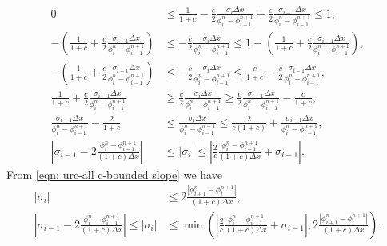 \documentclass[../thesis.tex]{subfiles}
\begin{document}
\begin{equation}
    \begin{split}
        0
        &\leq
        \frac{1}{1+c}
        -\frac{c}{2}
        \frac{\sigma_{i}\Delta x}
        {\phi_{i}^{n} - \phi_{i-1}^{n+1}}
        +\frac{c}{2}
        \frac{\sigma_{i-1}\Delta x}
        {\phi_{i}^{n} - \phi_{i-1}^{n+1}}
        \leq
        1,
        \\
        -\left(\frac{1}{1+c}
        + \frac{c}{2}
        \frac{\sigma_{i-1}\Delta x}
        {\phi_{i}^{n} - \phi_{i-1}^{n+1}}\right)
        &\leq
        -\frac{c}{2}
        \frac{\sigma_{i}\Delta x}
        {\phi_{i}^{n} - \phi_{i-1}^{n+1}}
        \leq
        1-\left(\frac{1}{1+c}
        + \frac{c}{2}
        \frac{\sigma_{i-1}\Delta x}
        {\phi_{i}^{n} - \phi_{i-1}^{n+1}}\right),
        \\
        -\left(\frac{1}{1+c}
        + \frac{c}{2}
        \frac{\sigma_{i-1}\Delta x}
        {\phi_{i}^{n} - \phi_{i-1}^{n+1}}\right)
        &\leq
        -\frac{c}{2}
        \frac{\sigma_{i}\Delta x}
        {\phi_{i}^{n} - \phi_{i-1}^{n+1}}
        \leq
        \frac{c}{1+c}
        - \frac{c}{2}
        \frac{\sigma_{i-1}\Delta x}
        {\phi_{i}^{n} - \phi_{i-1}^{n+1}},
        \\
        \frac{1}{1+c}
        + \frac{c}{2}
        \frac{\sigma_{i-1}\Delta x}
        {\phi_{i}^{n} - \phi_{i-1}^{n+1}}
        &\geq
        \frac{c}{2}
        \frac{\sigma_{i}\Delta x}
        {\phi_{i}^{n} - \phi_{i-1}^{n+1}}
        \geq
        \frac{c}{2}
        \frac{\sigma_{i-1}\Delta x}
        {\phi_{i}^{n} - \phi_{i-1}^{n+1}}
        -\frac{c}{1+c},
        \\
        \frac{\sigma_{i-1}\Delta x}
        {\phi_{i}^{n} - \phi_{i-1}^{n+1}}
        -\frac{2}{1+c}
        &\leq
        \frac{\sigma_{i}\Delta x}
        {\phi_{i}^{n} - \phi_{i-1}^{n+1}}
        \leq
        \frac{2}{c(1+c)}
        + \frac{\sigma_{i-1}\Delta x}
        {\phi_{i}^{n} - \phi_{i-1}^{n+1}},
        \\
        \left|\sigma_{i-1}
        -2\frac{\phi_{i}^{n} - \phi_{i-1}^{n+1}}
        {(1+c)\Delta x}\right|
        &\leq
        |\sigma_{i}|
        \leq
        \left|\frac{2}{c}
        \frac{\phi_{i}^{n} - \phi_{i-1}^{n+1}}
        {(1+c)\Delta x}
        + \sigma_{i-1}\right|.
    \end{split}
\end{equation}
From \eqref{eqn: urc-all c-bounded slope} we have
\begin{equation}
    \begin{split}
        |\sigma_{i}|
        &\leq
        2\frac{|\phi_{i+1}^{n} - \phi_{i}^{n+1}|}
        {(1+c)\Delta x},
        \\
        \left|\sigma_{i-1}
        -2\frac{\phi_{i}^{n} - \phi_{i-1}^{n+1}}
        {(1+c)\Delta x}\right|
        \leq
        |\sigma_{i}|
        &\leq
        \min\left( \left|\frac{2}{c}
        \frac{\phi_{i}^{n} - \phi_{i-1}^{n+1}}
        {(1+c)\Delta x}
        + \sigma_{i-1}\right|,
        2\frac{|\phi_{i+1}^{n} - \phi_{i}^{n+1}|}
        {(1+c)\Delta x}\right).
    \end{split}
\end{equation}
\end{document}
